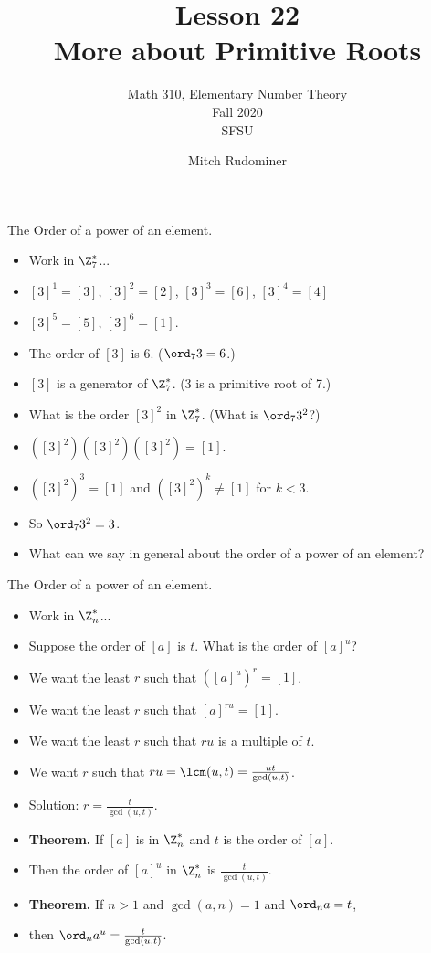 \documentclass{beamer}
\title{Lesson 22 \\ More about Primitive Roots}
\subtitle{Math 310, Elementary Number Theory \\ Fall 2020 \\ SFSU}
\author{Mitch Rudominer}
\date{}
\begin{document}
\begin{frame}
  \titlepage
\end{frame}

\begin{frame}{The Order of a power of an element.}

\begin{itemize}
  \item Work in $\Z_7^*$...
  \item $[3]^1=[3]$, $[3]^2=[2]$, $[3]^3=[6]$, $[3]^4=[4]$
  \item $[3]^5=[5]$, $[3]^6=[1]$.
  \item The order of $[3]$ is $6$. ($\ord_7 3 = 6$.)
  \item $[3]$ is a generator of $\Z_7^*$. (3 is a primitive root of 7.)
  \item What is the order $[3]^2$ in $\Z_7^*$. (What is $\ord_7 3^2$?)
  \item $([3]^2)([3]^2)([3]^2)=[1]$.
  \item $([3]^2)^3 = [1]$ and $([3]^2)^k\not=[1]$ for $k<3$.
  \item So $\ord_7 3^2 = 3$.
  \item What can we say in general about the order of a power of an element?
\end{itemize}

\end{frame}

\begin{frame}{The Order of a power of an element.}

\begin{itemize}
  \item Work in $\Z_n^*$...
  \item Suppose the order of $[a]$ is $t$. What is the order of $[a]^u$?
  \item We want the least $r$ such that $([a]^u)^r = [1]$.
  \item We want the least $r$ such that $[a]^{ru} = [1]$.
  \item We want the least $r$ such that $ru$ is a multiple of $t$.
  \item We want $r$ such that $ru = \lcm(u,t) = \frac{ut}{\gcd(u,t)}$.
  \item Solution: $r=\frac{t}{\gcd(u,t)}$.
  \item \textbf{Theorem.} If $[a]$ is in $\Z_n^*$ and $t$ is the order of $[a]$.
  \item Then the order of $[a]^u$ in $\Z_n^*$ is $\frac{t}{\gcd(u,t)}$.
  \item \textbf{Theorem.} If $n>1$ and $\gcd(a,n)=1$ and $\ord_n a = t$,
  \item then $\ord_n a^u = \frac{t}{\gcd(u,t)}$.
\end{itemize}

\end{frame}
\end{document}
